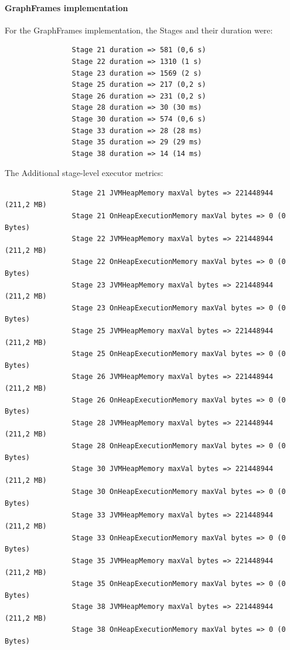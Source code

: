 \documentclass[a4paper,11pt, twoside]{article}
\begin{document}
            \paragraph{GraphFrames implementation}
            For the GraphFrames implementation, the Stages and their duration were:
            \begin{verbatim}
                Stage 21 duration => 581 (0,6 s)
                Stage 22 duration => 1310 (1 s)
                Stage 23 duration => 1569 (2 s)
                Stage 25 duration => 217 (0,2 s)
                Stage 26 duration => 231 (0,2 s)
                Stage 28 duration => 30 (30 ms)
                Stage 30 duration => 574 (0,6 s)
                Stage 33 duration => 28 (28 ms)
                Stage 35 duration => 29 (29 ms)
                Stage 38 duration => 14 (14 ms)
            \end{verbatim}
            \bigskip
            The Additional stage-level executor metrics:
            \begin{verbatim}
                Stage 21 JVMHeapMemory maxVal bytes => 221448944 (211,2 MB)
                Stage 21 OnHeapExecutionMemory maxVal bytes => 0 (0 Bytes)
                Stage 22 JVMHeapMemory maxVal bytes => 221448944 (211,2 MB)
                Stage 22 OnHeapExecutionMemory maxVal bytes => 0 (0 Bytes)
                Stage 23 JVMHeapMemory maxVal bytes => 221448944 (211,2 MB)
                Stage 23 OnHeapExecutionMemory maxVal bytes => 0 (0 Bytes)
                Stage 25 JVMHeapMemory maxVal bytes => 221448944 (211,2 MB)
                Stage 25 OnHeapExecutionMemory maxVal bytes => 0 (0 Bytes)
                Stage 26 JVMHeapMemory maxVal bytes => 221448944 (211,2 MB)
                Stage 26 OnHeapExecutionMemory maxVal bytes => 0 (0 Bytes)
                Stage 28 JVMHeapMemory maxVal bytes => 221448944 (211,2 MB)
                Stage 28 OnHeapExecutionMemory maxVal bytes => 0 (0 Bytes)
                Stage 30 JVMHeapMemory maxVal bytes => 221448944 (211,2 MB)
                Stage 30 OnHeapExecutionMemory maxVal bytes => 0 (0 Bytes)
                Stage 33 JVMHeapMemory maxVal bytes => 221448944 (211,2 MB)
                Stage 33 OnHeapExecutionMemory maxVal bytes => 0 (0 Bytes)
                Stage 35 JVMHeapMemory maxVal bytes => 221448944 (211,2 MB)
                Stage 35 OnHeapExecutionMemory maxVal bytes => 0 (0 Bytes)
                Stage 38 JVMHeapMemory maxVal bytes => 221448944 (211,2 MB)
                Stage 38 OnHeapExecutionMemory maxVal bytes => 0 (0 Bytes)
            \end{verbatim}
    	\clearpage
    
\end{document}
